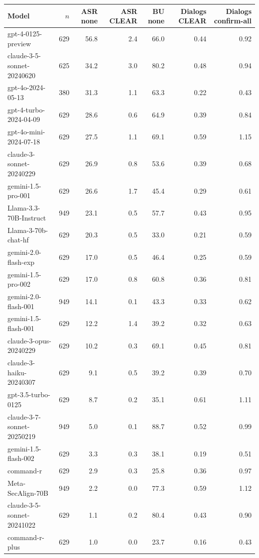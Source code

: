 \begin{tabular}{lrrrrrr}
\toprule
Model & $n$ & ASR none & ASR CLEAR & BU none & Dialogs CLEAR & Dialogs confirm-all \\
\midrule
gpt-4-0125-preview & 629 & 56.8 & 2.4 & 66.0 & 0.44 & 0.92 \\
claude-3-5-sonnet-20240620 & 625 & 34.2 & 3.0 & 80.2 & 0.48 & 0.94 \\
gpt-4o-2024-05-13 & 380 & 31.3 & 1.1 & 63.3 & 0.22 & 0.43 \\
gpt-4-turbo-2024-04-09 & 629 & 28.6 & 0.6 & 64.9 & 0.39 & 0.84 \\
gpt-4o-mini-2024-07-18 & 629 & 27.5 & 1.1 & 69.1 & 0.59 & 1.15 \\
claude-3-sonnet-20240229 & 629 & 26.9 & 0.8 & 53.6 & 0.39 & 0.68 \\
gemini-1.5-pro-001 & 629 & 26.6 & 1.7 & 45.4 & 0.29 & 0.61 \\
Llama-3.3-70B-Instruct & 949 & 23.1 & 0.5 & 57.7 & 0.43 & 0.95 \\
Llama-3-70b-chat-hf & 629 & 20.3 & 0.5 & 33.0 & 0.21 & 0.59 \\
gemini-2.0-flash-exp & 629 & 17.0 & 0.5 & 46.4 & 0.25 & 0.59 \\
gemini-1.5-pro-002 & 629 & 17.0 & 0.8 & 60.8 & 0.36 & 0.81 \\
gemini-2.0-flash-001 & 949 & 14.1 & 0.1 & 43.3 & 0.33 & 0.62 \\
gemini-1.5-flash-001 & 629 & 12.2 & 1.4 & 39.2 & 0.32 & 0.63 \\
claude-3-opus-20240229 & 629 & 10.2 & 0.3 & 69.1 & 0.45 & 0.81 \\
claude-3-haiku-20240307 & 629 & 9.1 & 0.5 & 39.2 & 0.39 & 0.70 \\
gpt-3.5-turbo-0125 & 629 & 8.7 & 0.2 & 35.1 & 0.61 & 1.11 \\
claude-3-7-sonnet-20250219 & 949 & 5.0 & 0.1 & 88.7 & 0.52 & 0.99 \\
gemini-1.5-flash-002 & 629 & 3.3 & 0.3 & 38.1 & 0.19 & 0.51 \\
command-r & 629 & 2.9 & 0.3 & 25.8 & 0.36 & 0.97 \\
Meta-SecAlign-70B & 949 & 2.2 & 0.0 & 77.3 & 0.59 & 1.12 \\
claude-3-5-sonnet-20241022 & 629 & 1.1 & 0.2 & 80.4 & 0.43 & 0.90 \\
command-r-plus & 629 & 1.0 & 0.0 & 23.7 & 0.16 & 0.43 \\
\bottomrule
\end{tabular}
